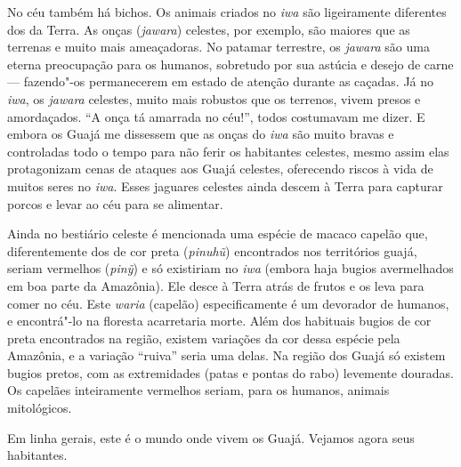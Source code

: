 No céu também há bichos. Os animais criados no \emph{iwa} são
ligeiramente diferentes dos da Terra. As onças (\emph{jawara}) celestes,
por exemplo, são maiores que as terrenas e muito mais ameaçadoras. No
patamar terrestre, os \emph{jawara} são uma eterna preocupação para os
humanos, sobretudo por sua astúcia e desejo de carne --- fazendo"-os
permanecerem em estado de atenção durante as caçadas. Já no \emph{iwa},
os \emph{jawara} celestes, muito mais robustos que os terrenos, vivem
presos e amordaçados. ``A onça tá amarrada no céu!'', todos costumavam me
dizer. E embora os Guajá me dissessem que as onças do \emph{iwa} são
muito bravas e controladas todo o tempo para não ferir os habitantes
celestes, mesmo assim elas protagonizam cenas de ataques aos Guajá
celestes, oferecendo riscos à vida de muitos seres no \emph{iwa}. Esses
jaguares celestes ainda descem à Terra para capturar porcos e levar ao
céu para se alimentar.

Ainda no bestiário celeste é mencionada uma espécie de macaco capelão
que, diferentemente dos de cor preta (\emph{pinuhũ}) encontrados nos
territórios guajá, seriam vermelhos (\emph{pinỹ}) e só existiriam no
\emph{iwa} (embora haja bugios avermelhados em boa parte da Amazônia).
Ele desce à Terra atrás de frutos e os leva para comer no céu. Este
\emph{waria} (capelão) especificamente é um devorador de humanos, e
encontrá"-lo na floresta acarretaria morte. Além dos habituais bugios de
cor preta encontrados na região, existem variações da cor dessa espécie
pela Amazônia, e a variação ``ruiva'' seria uma delas. Na região dos
Guajá só existem bugios pretos, com as extremidades (patas e pontas do
rabo) levemente douradas. Os capelães inteiramente vermelhos seriam,
para os humanos, animais mitológicos.

Em linha gerais, este é o mundo onde vivem os Guajá. Vejamos agora seus
habitantes.

